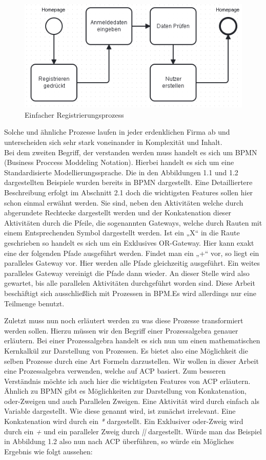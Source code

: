 \begin{figure}
\centering
\includegraphics[scale=0.7]{Figures/Einleitungbsp2}
\decoRule
\caption[Einfacher Registrierungsprozess]{Einfacher Registrierungsprozess}
\label{fig:Task}
\end{figure}
Solche und ähnliche Prozesse laufen in jeder erdenklichen Firma ab und unterscheiden sich sehr stark voneinander in Komplexität und Inhalt.\\
Bei dem zweiten Begriff, der verstanden werden muss handelt es sich um BPMN (Business Proccess Moddeling Notation). Hierbei handelt es sich um eine Standardisierte Modellierungssprache. Die in den Abbildungen 1.1 und 1.2 dargestellten Beispiele wurden bereits in BPMN dargestellt. Eine Detailliertere Beschreibung erfolgt im Abschnitt 2.1 doch die wichtigsten Features sollen hier schon einmal erwähnt werden. Sie sind, neben den Aktivitäten welche durch abgerundete Rechtecke dargestellt werden und der Konkatenation dieser Aktivitäten durch die Pfeile, die sogenannten Gateways, welche durch Rauten mit einem Entsprechenden Symbol dargestellt werden. Ist ein „X“ in die Raute geschrieben so handelt es sich um ein Exklusives OR-Gateway. Hier kann exakt eine der folgenden Pfade ausgeführt werden. Findet man ein „+“ vor, so liegt ein paralleles Gateway vor. Hier werden alle Pfade gleichzeitig ausgeführt. Ein weites paralleles Gateway vereinigt die Pfade dann wieder. An dieser Stelle wird also gewartet, bis alle parallelen Aktivitäten durchgeführt worden sind. Diese Arbeit beschäftigt sich ausschließlich mit Prozessen in BPM.Es wird allerdings nur eine Teilmenge benutzt.

Zuletzt muss nun noch erläutert werden zu was diese Prozesse transformiert werden sollen. Hierzu müssen wir den Begriff einer Prozessalgebra genauer erläutern. Bei einer Prozessalgebra handelt es sich nun um einen mathematischen Kernkalkül zur Darstellung von Prozessen. Es bietet also eine Möglichkeit die selben Prozesse durch eine Art Formeln darzustellen. Wir wollen in dieser Arbeit eine Prozessalgebra verwenden, welche auf ACP basiert.  Zum besseren Verständnis möchte ich auch hier die wichtigsten Features von ACP erläutern. Ähnlich zu BPMN gibt es Möglichkeiten zur Darstellung von Konkatenation, oder-Zweigen und auch Parallelen Zweigen. Eine Aktivität wird durch einfach als Variable dargestellt. Wie diese genannt wird, ist zunächst irrelevant. Eine Konkatenation wird durch ein \textit{*} dargestellt. Ein Exklusiver oder-Zweig wird durch ein \textit{+} und ein paralleler Zweig durch \textit{||} dargestellt. Würde man das Beispiel in Abbildung 1.2 also nun nach ACP überführen, so würde ein Mögliches Ergebnis wie folgt aussehen: 

